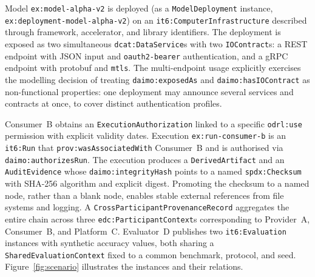 \documentclass[Afour,sagev,times]{sagej}
\newcommand{\code}[1]{\texttt{#1}}
\begin{document}
Model \code{ex:model-alpha-v2} is deployed (as a \code{ModelDeployment} instance, \code{ex:deployment-model-alpha-v2}) on an \code{it6:ComputerInfrastructure} described through framework, accelerator, and library identifiers. The deployment is exposed as two simultaneous \code{dcat:DataService}s with two \code{IOContract}s: a REST endpoint with JSON input and \code{oauth2-bearer} authentication, and a gRPC endpoint with protobuf and \code{mtls}. The multi-endpoint usage explicitly exercises the modelling decision of treating \code{daimo:exposedAs} and \code{daimo:hasIOContract} as non-functional properties: one deployment may announce several services and contracts at once, to cover distinct authentication profiles.

Consumer~B obtains an \code{ExecutionAuthorization} linked to a specific \code{odrl:use} permission with explicit validity dates. Execution \code{ex:run-consumer-b} is an \code{it6:Run} that \code{prov:wasAssociatedWith} Consumer~B and is authorised via \code{daimo:authorizesRun}. The execution produces a \code{DerivedArtifact} and an \code{AuditEvidence} whose \code{daimo:integrityHash} points to a named \code{spdx:Checksum} with SHA-256 algorithm and explicit digest. Promoting the checksum to a named node, rather than a blank node, enables stable external references from file systems and logging. A \code{CrossParticipantProvenanceRecord} aggregates the entire chain across three \code{edc:ParticipantContext}s corresponding to Provider~A, Consumer~B, and Platform~C. Evaluator~D publishes two \code{it6:Evaluation} instances with synthetic accuracy values, both sharing a \code{SharedEvaluationContext} fixed to a common benchmark, protocol, and seed. Figure~\ref{fig:scenario} illustrates the instances and their relations.
\end{document}
